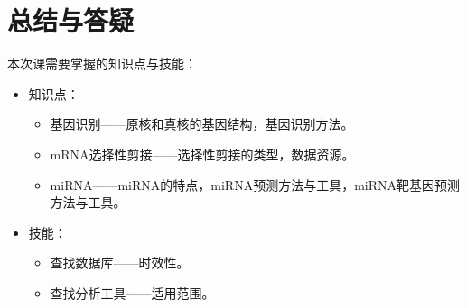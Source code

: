 \section{总结与答疑}
本次课需要掌握的知识点与技能：
\begin{itemize}
	\item 知识点：
		\begin{itemize}
			\item 基因识别——原核和真核的基因结构，基因识别方法。
			\item mRNA选择性剪接——选择性剪接的类型，数据资源。
			\item miRNA——miRNA的特点，miRNA预测方法与工具，miRNA靶基因预测方法与工具。
		\end{itemize}
	\item 技能：
		\begin{itemize}
			\item 查找数据库——时效性。
			\item 查找分析工具——适用范围。
		\end{itemize}
\end{itemize}



